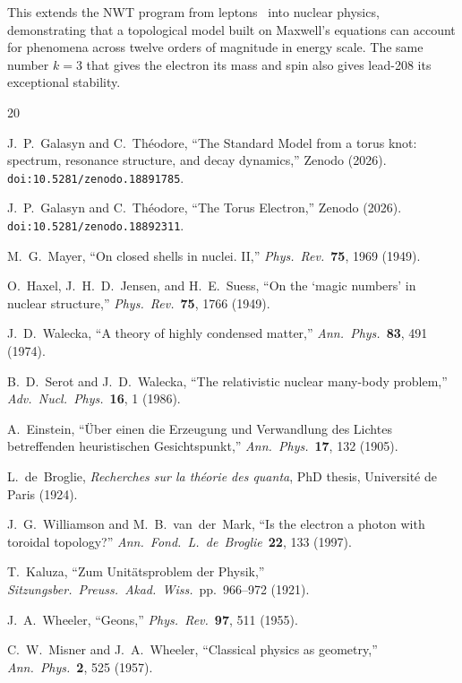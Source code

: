\documentclass[11pt,a4paper]{article}
\begin{document}
This extends the NWT program from leptons~\cite{paper1,paper2} into nuclear
physics, demonstrating that a topological model built on Maxwell's equations
can account for phenomena across twelve orders of magnitude in energy scale.
The same number $k = 3$ that gives the electron its mass and spin also gives
lead-208 its exceptional stability.


\begin{thebibliography}{20}

  J.~P.~Galasyn and C.~Th\'eodore,
  ``The Standard Model from a torus knot: spectrum, resonance structure,
  and decay dynamics,'' Zenodo (2026).
  \texttt{doi:10.5281/zenodo.18891785}.

  J.~P.~Galasyn and C.~Th\'eodore,
  ``The Torus Electron,'' Zenodo (2026).
  \texttt{doi:10.5281/zenodo.18892311}.

  M.~G.~Mayer,
  ``On closed shells in nuclei. II,''
  \emph{Phys.\ Rev.}\ \textbf{75}, 1969 (1949).

  O.~Haxel, J.~H.~D.~Jensen, and H.~E.~Suess,
  ``On the `magic numbers' in nuclear structure,''
  \emph{Phys.\ Rev.}\ \textbf{75}, 1766 (1949).

  J.~D.~Walecka,
  ``A theory of highly condensed matter,''
  \emph{Ann.\ Phys.}\ \textbf{83}, 491 (1974).

  B.~D.~Serot and J.~D.~Walecka,
  ``The relativistic nuclear many-body problem,''
  \emph{Adv.\ Nucl.\ Phys.}\ \textbf{16}, 1 (1986).

  A.~Einstein,
  ``\"Uber einen die Erzeugung und Verwandlung des Lichtes
  betreffenden heuristischen Gesichtspunkt,''
  \emph{Ann.\ Phys.}\ \textbf{17}, 132 (1905).

  L.~de~Broglie,
  \emph{Recherches sur la th\'eorie des quanta},
  PhD thesis, Universit\'e de Paris (1924).

  J.~G.~Williamson and M.~B.~van~der~Mark,
  ``Is the electron a photon with toroidal topology?''
  \emph{Ann.\ Fond.\ L.\ de~Broglie}\ \textbf{22}, 133 (1997).

  T.~Kaluza,
  ``Zum Unit\"atsproblem der Physik,''
  \emph{Sitzungsber.\ Preuss.\ Akad.\ Wiss.}\ pp.\ 966--972 (1921).

  J.~A.~Wheeler,
  ``Geons,''
  \emph{Phys.\ Rev.}\ \textbf{97}, 511 (1955).

  C.~W.~Misner and J.~A.~Wheeler,
  ``Classical physics as geometry,''
  \emph{Ann.\ Phys.}\ \textbf{2}, 525 (1957).

\end{thebibliography}
\end{document}
